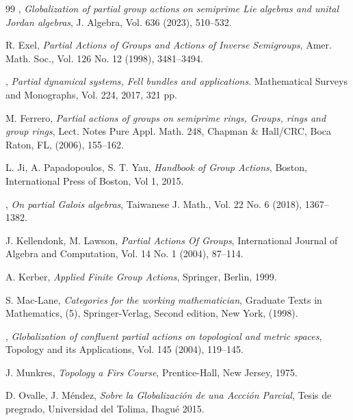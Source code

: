 \documentclass[sn-mathphys-num]{sn-jnl}%
\theoremstyle{thmstyleone}%
\theoremstyle{thmstyletwo}%
\theoremstyle{thmstylethree}%
\begin{document}
\begin{thebibliography}{99}
, {\em Globalization of partial group actions on semiprime Lie algebras and unital Jordan algebras}, J. Algebra, Vol. 636 (2023), 510--532.


{\sc  R. Exel}, {\em Partial Actions of Groups and Actions of Inverse Semigroups},
Amer. Math. Soc., Vol. 126 No. 12 (1998), 3481--3494.

, {\em Partial dynamical systems, Fell bundles and applications}. Mathematical Surveys and Monographs, Vol. 224, 2017, 321 pp.

{\sc M. Ferrero}, {\em Partial actions of groups on semiprime rings, Groups, rings and group rings},
Lect. Notes Pure Appl. Math. 248, Chapman \& Hall/CRC, Boca
Raton, FL, (2006), 155--162.

{\sc L. Ji, A. Papadopoulos,  S. T. Yau}, {\em Handbook of Group Actions},
Boston, International Press of Boston,
Vol 1, 2015.

, {\em On partial Galois algebras}, Taiwanese J. Math., Vol. 22 No. 6 (2018), 1367--1382.


{\sc J. Kellendonk, M. Lawson}, {\em Partial Actions Of Groups},
International Journal
of Algebra and Computation, Vol. 14 No. 1 (2004), 87--114.

{\sc A. Kerber}, {\em Applied Finite Group Actions}, Springer, Berlin, 1999.

{\sc S. Mac-Lane}, {\em Categories for the working mathematician},
 Graduate Texts in Mathematics,
(5), Springer-Verlag, Second edition, New York, (1998).


, {\em Globalization of confluent partial actions on topological and metric spaces}, Topology and its Applications, Vol. 145 (2004), 119--145.


{\sc J. Munkres}, {\em Topology a Firs Course}, Prentice-Hall, New Jersey, 1975.

{\sc D. Ovalle,  J. Méndez}, {\em Sobre la Globalización de una Accción Parcial},
Tesis de pregrado, Universidad del Tolima, Ibagu\'e 2015.


\end{thebibliography}
\end{document}
